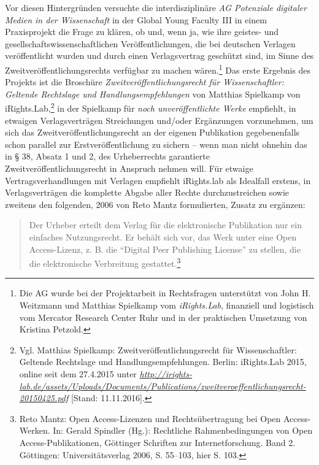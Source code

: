 \documentclass[a4paper,
fontsize=11pt,
oneside,
numbers=noperiodatend,
parskip=half-,
bibliography=totoc,
final
]{scrartcl}
\begin{document}
Vor diesen Hintergründen versuchte die interdisziplinäre \emph{AG
Potenziale digitaler Medien in der Wissenschaft} in der Global Young
Faculty III in einem Praxisprojekt die Frage zu klären, ob und, wenn ja,
wie ihre geistes- und gesellschaftswissenschaftlichen
Veröffentlichungen, die bei deutschen Verlagen veröffentlicht wurden und
durch einen Verlagsvertrag geschützt sind, im Sinne des
Zweitveröffentlichungsrechts verfügbar zu machen wären.\footnote{Die AG
  wurde bei der Projektarbeit in Rechtsfragen unterstützt von John H.
  Weitzmann und Matthias Spielkamp vom \emph{iRights.Lab}, finanziell
  und logistisch vom Mercator Research Center Ruhr und in der
  praktischen Umsetzung von Kristina Petzold.} Das erste Ergebnis des
Projekts ist die Broschüre \emph{Zweitveröffentlichungsrecht für
Wissenschaftler: Geltende Rechtslage und Handlungsempfehlungen} von
Matthias Spielkamp von iRights.Lab,\footnote{Vgl. Matthias Spielkamp:
  Zweitveröffentlichungsrecht für Wissenschaftler: Geltende Rechtslage
  und Handlungsempfehlungen. Berlin: iRights.Lab 2015, online seit dem
  27.4.2015 unter
  \href{http://irights-lab.de/assets/Uploads/Documents/Publications/zweitveroeffentlichungsrecht-20150425.pdf}{\emph{http://irights-lab.de/assets/Uploads/Documents/Publications/zweitveroeffentlichungsrecht-20150425.pdf}}
  {[}Stand: 11.11.2016{]}.} in der Spielkamp für \emph{noch
unveröffentlichte Werke} empfiehlt, in etwaigen Verlagsverträgen
Streichungen und/oder Ergänzungen vorzunehmen, um sich das
Zweitveröffentlichungsrecht an der eigenen Publikation gegebenenfalls
schon parallel zur Erstveröffentlichung zu sichern -- wenn man nicht
ohnehin das in § 38, Absatz 1 und 2, des Urheberrechts garantierte
Zweitveröffentlichungsrecht in Anspruch nehmen will. Für etwaige
Vertragsverhandlungen mit Verlagen empfiehlt iRights.lab als Idealfall
erstens, in Verlagsverträgen die komplette Abgabe aller Rechte
durchzustreichen sowie zweitens den folgenden, 2006 von Reto Mantz
formulierten, Zusatz zu ergänzen:

\begin{quote}
Der Urheber erteilt dem Verlag für die elektronische Publikation nur ein
einfaches Nutzungsrecht. Er behält sich vor, das Werk unter eine Open
Access-Lizenz, z. B. die \enquote{Digital Peer Publishing License} zu
stellen, die die elektronische Verbreitung gestattet.\footnote{Reto
  Mantz: Open Access-Lizenzen und Rechtsübertragung bei Open
  Access-Werken. In: Gerald Spindler (Hg.): Rechtliche Rahmenbedingungen
  von Open Access-Publikationen, Göttinger Schriften zur
  Internetforschung. Band 2. Göttingen: Universitätsverlag 2006, S.
  55--103, hier S. 103.}
\end{quote}
\end{document}
